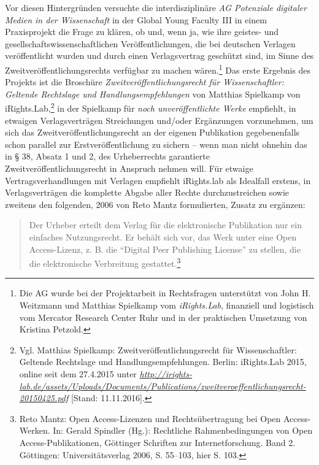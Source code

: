 \documentclass[a4paper,
fontsize=11pt,
oneside,
numbers=noperiodatend,
parskip=half-,
bibliography=totoc,
final
]{scrartcl}
\begin{document}
Vor diesen Hintergründen versuchte die interdisziplinäre \emph{AG
Potenziale digitaler Medien in der Wissenschaft} in der Global Young
Faculty III in einem Praxisprojekt die Frage zu klären, ob und, wenn ja,
wie ihre geistes- und gesellschaftswissenschaftlichen
Veröffentlichungen, die bei deutschen Verlagen veröffentlicht wurden und
durch einen Verlagsvertrag geschützt sind, im Sinne des
Zweitveröffentlichungsrechts verfügbar zu machen wären.\footnote{Die AG
  wurde bei der Projektarbeit in Rechtsfragen unterstützt von John H.
  Weitzmann und Matthias Spielkamp vom \emph{iRights.Lab}, finanziell
  und logistisch vom Mercator Research Center Ruhr und in der
  praktischen Umsetzung von Kristina Petzold.} Das erste Ergebnis des
Projekts ist die Broschüre \emph{Zweitveröffentlichungsrecht für
Wissenschaftler: Geltende Rechtslage und Handlungsempfehlungen} von
Matthias Spielkamp von iRights.Lab,\footnote{Vgl. Matthias Spielkamp:
  Zweitveröffentlichungsrecht für Wissenschaftler: Geltende Rechtslage
  und Handlungsempfehlungen. Berlin: iRights.Lab 2015, online seit dem
  27.4.2015 unter
  \href{http://irights-lab.de/assets/Uploads/Documents/Publications/zweitveroeffentlichungsrecht-20150425.pdf}{\emph{http://irights-lab.de/assets/Uploads/Documents/Publications/zweitveroeffentlichungsrecht-20150425.pdf}}
  {[}Stand: 11.11.2016{]}.} in der Spielkamp für \emph{noch
unveröffentlichte Werke} empfiehlt, in etwaigen Verlagsverträgen
Streichungen und/oder Ergänzungen vorzunehmen, um sich das
Zweitveröffentlichungsrecht an der eigenen Publikation gegebenenfalls
schon parallel zur Erstveröffentlichung zu sichern -- wenn man nicht
ohnehin das in § 38, Absatz 1 und 2, des Urheberrechts garantierte
Zweitveröffentlichungsrecht in Anspruch nehmen will. Für etwaige
Vertragsverhandlungen mit Verlagen empfiehlt iRights.lab als Idealfall
erstens, in Verlagsverträgen die komplette Abgabe aller Rechte
durchzustreichen sowie zweitens den folgenden, 2006 von Reto Mantz
formulierten, Zusatz zu ergänzen:

\begin{quote}
Der Urheber erteilt dem Verlag für die elektronische Publikation nur ein
einfaches Nutzungsrecht. Er behält sich vor, das Werk unter eine Open
Access-Lizenz, z. B. die \enquote{Digital Peer Publishing License} zu
stellen, die die elektronische Verbreitung gestattet.\footnote{Reto
  Mantz: Open Access-Lizenzen und Rechtsübertragung bei Open
  Access-Werken. In: Gerald Spindler (Hg.): Rechtliche Rahmenbedingungen
  von Open Access-Publikationen, Göttinger Schriften zur
  Internetforschung. Band 2. Göttingen: Universitätsverlag 2006, S.
  55--103, hier S. 103.}
\end{quote}
\end{document}
